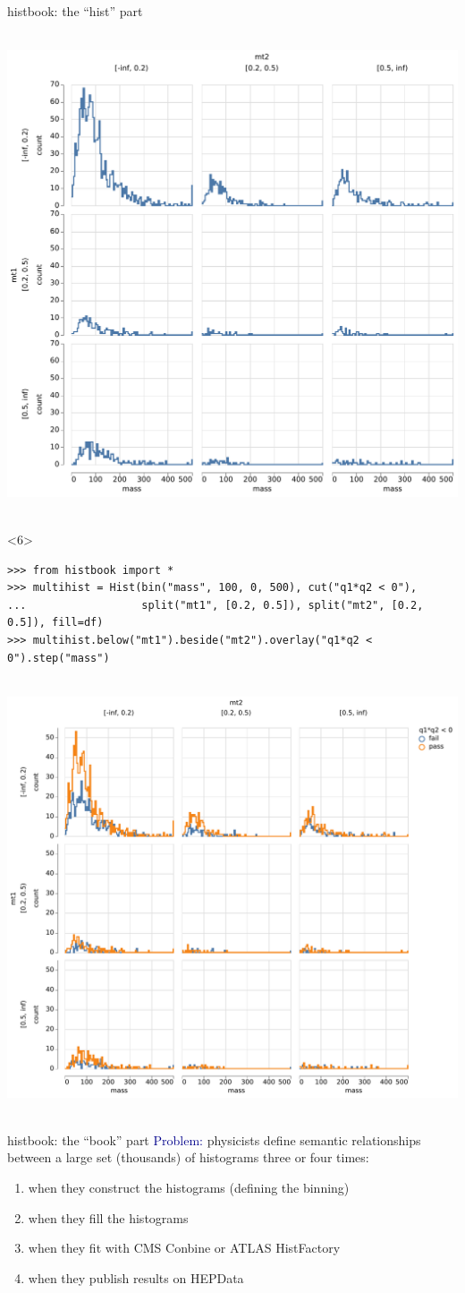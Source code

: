 \documentclass[aspectratio=169]{beamer}
\begin{document}
\begin{frame}[fragile]{histbook: the ``hist'' part}
\begin{onlyenv}
\mbox{ } \hfill \includegraphics[height=6 cm]{pandhist_double_trellis.pdf} \hfill \mbox{ }
\end{onlyenv}
\begin{onlyenv}<6>
\scriptsize
\begin{verbatim}
>>> from histbook import *
>>> multihist = Hist(bin("mass", 100, 0, 500), cut("q1*q2 < 0"),
...                  split("mt1", [0.2, 0.5]), split("mt2", [0.2, 0.5]), fill=df)
>>> multihist.below("mt1").beside("mt2").overlay("q1*q2 < 0").step("mass")
\end{verbatim}
\mbox{ } \hfill \includegraphics[height=6 cm]{pandhist_double_trellis_overlay.pdf} \hfill \mbox{ }
\end{onlyenv}
\end{frame}

\begin{frame}{histbook: the ``book'' part}
\vspace{0.5 cm}
\textcolor{darkblue}{Problem:} physicists define semantic relationships between a large set (thousands) of histograms three or four times:
\begin{enumerate}
\item when they construct the histograms (defining the binning)
\item when they fill the histograms
\item when they fit with CMS Conbine or ATLAS HistFactory
\item when they publish results on HEPData
\end{enumerate}

\vspace{0.5 cm}
\end{frame}
\end{document}
